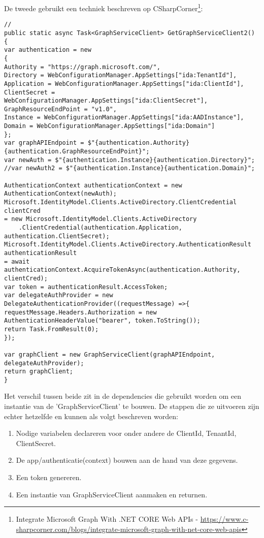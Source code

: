 De tweede gebruikt een techniek beschreven op CSharpCorner\footnote{Integrate Microsoft Graph With .NET CORE Web APIs - \url{https://www.c-sharpcorner.com/blogs/integrate-microsoft-graph-with-net-core-web-apis}}:
\begin{lstlisting}[style=CSharpStyle]
//
public static async Task<GraphServiceClient> GetGraphServiceClient2()
{
var authentication = new
{
Authority = "https://graph.microsoft.com/",
Directory = WebConfigurationManager.AppSettings["ida:TenantId"],
Application = WebConfigurationManager.AppSettings["ida:ClientId"],
ClientSecret = WebConfigurationManager.AppSettings["ida:ClientSecret"],
GraphResourceEndPoint = "v1.0",
Instance = WebConfigurationManager.AppSettings["ida:AADInstance"],
Domain = WebConfigurationManager.AppSettings["ida:Domain"]
};
var graphAPIEndpoint = $"{authentication.Authority}{authentication.GraphResourceEndPoint}";
var newAuth = $"{authentication.Instance}{authentication.Directory}";
//var newAuth2 = $"{authentication.Instance}{authentication.Domain}";

AuthenticationContext authenticationContext = new AuthenticationContext(newAuth);
Microsoft.IdentityModel.Clients.ActiveDirectory.ClientCredential clientCred 
= new Microsoft.IdentityModel.Clients.ActiveDirectory
    .ClientCredential(authentication.Application, authentication.ClientSecret);
Microsoft.IdentityModel.Clients.ActiveDirectory.AuthenticationResult authenticationResult 
= await authenticationContext.AcquireTokenAsync(authentication.Authority, clientCred);
var token = authenticationResult.AccessToken;
var delegateAuthProvider = new DelegateAuthenticationProvider((requestMessage) =>{
requestMessage.Headers.Authorization = new AuthenticationHeaderValue("bearer", token.ToString());
return Task.FromResult(0);
});

var graphClient = new GraphServiceClient(graphAPIEndpoint, delegateAuthProvider);
return graphClient;
}
\end{lstlisting}

Het verschil tussen beide zit in de dependencies die gebruikt worden om een instantie van de 'GraphServiceClient' te bouwen. De stappen die ze uitvoeren zijn echter hetzelfde en kunnen als volgt beschreven worden:
\begin{enumerate}
    \item Nodige variabelen declareren voor onder andere de ClientId, TenantId, ClientSecret.
    \item De app/authenticatie(context) bouwen aan de hand van deze gegevens.
    \item Een token genereren.
    \item Een instantie van GraphServiceClient aanmaken en returnen.
\end{enumerate}

